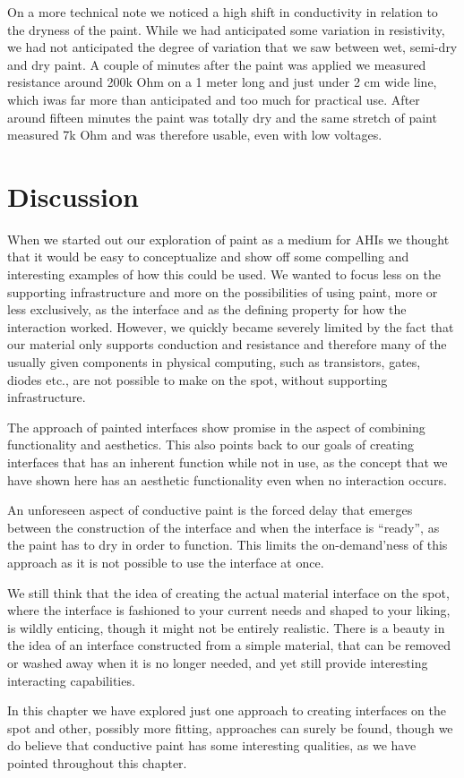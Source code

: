 On a more technical note we noticed a high shift in conductivity in relation to the dryness of the paint.
While we had anticipated some variation in resistivity, we had not anticipated the degree of variation that we saw between wet, semi-dry and dry paint.
A couple of minutes after the paint was applied we measured resistance around 200k Ohm on a 1 meter long and just under 2 cm wide line, which iwas far more than anticipated and too much for practical use.
After around fifteen minutes the paint was totally dry and the same stretch of paint measured 7k Ohm and was therefore usable, even with low voltages.

\section{Discussion}
When we started out our exploration of paint as a medium for AHIs we thought that it would be easy to conceptualize and show off some compelling and interesting examples of how this could be used.
We wanted to focus less on the supporting infrastructure and more on the possibilities of using paint, more or less exclusively, as the interface and as the defining property for how the interaction worked. 
However, we quickly became severely limited by the fact that our material only supports conduction and resistance and therefore many of the usually given components in physical computing, such as transistors, gates, diodes etc., are not possible to make on the spot, without supporting infrastructure.  

The approach of painted interfaces show promise in the aspect of combining functionality and aesthetics.
This also points back to our goals of creating interfaces that has an inherent function while not in use, as the concept that we have shown here has an aesthetic functionality even when no interaction occurs.

An unforeseen aspect of conductive paint is the forced delay that emerges between the construction of the interface and when the interface is ``ready'', as the paint has to dry in order to function.
This limits the on-demand'ness of this approach as it is not possible to use the interface at once. 

We still think that the idea of creating the actual material interface on the spot, where the interface is fashioned to your current needs and shaped to your liking, is wildly enticing, though it might not be entirely realistic.
There is a beauty in the idea of an interface constructed from a simple material, that can be removed or washed away when it is no longer needed, and yet still provide interesting interacting capabilities.

In this chapter we have explored just one approach to creating interfaces on the spot and other, possibly more fitting, approaches can surely be found, though we do believe that conductive paint has some interesting qualities, as we have pointed throughout this chapter.
